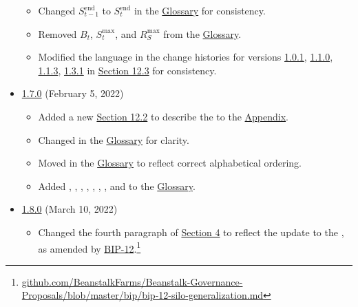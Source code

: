 \documentclass[class=article, crop=false]{standalone}
\begin{document}
\begin{itemize}[topsep=0pt, itemsep=3pt,leftmargin=16pt]
\begin{itemize}
        \item Changed $S_{t-1}^{\text{end}}$ to $S_t^{\text{end}}$ in the \hyperlink{subsection.12.2}{Glossary} for consistency. 
        \item Removed $B_t$, $S_t^{\text{max}}$, and $R_S^{\text{max}}$ from the \hyperlink{subsection.12.2}{Glossary}. 
        \item Modified the language in the change histories for versions \href{https://github.com/BeanstalkFarms/Beanstalk/blob/master/version-history/beanstalk1_0_1.pdf}{1.0.1}, \href{https://github.com/BeanstalkFarms/Beanstalk/blob/master/version-history/beanstalk1_1_0.pdf}{1.1.0}, \href{https://github.com/BeanstalkFarms/Beanstalk/blob/master/version-history/beanstalk1_1_3.pdf}{1.1.3}, \href{https://github.com/BeanstalkFarms/Beanstalk/blob/master/version-history/beanstalk1_3_1.pdf}{1.3.1} in \hyperlink{subsection.12.3}{Section 12.3} for consistency.
    \end{itemize}
    \newpage
    \item \href{https://github.com/BeanstalkFarms/Beanstalk/blob/master/version-history/beanstalk1_7_0.pdf}{1.7.0} (February 5, 2022)
    \begin{itemize}
        \item Added a new \hyperlink{subsection.12.2}{Section 12.2} to describe the  to the \hyperlink{section.12}{Appendix}.
        \item Changed  in the \hyperlink{subsection.12.2}{Glossary} for clarity. 
        \item Moved  in the \hyperlink{subsection.12.2}{Glossary} to reflect correct alphabetical ordering. 
        \item Added , , , , , , , and  to the \hyperlink{subsection.12.2}{Glossary}. 
    \end{itemize}
        \item \href{https://github.com/BeanstalkFarms/Beanstalk/blob/master/version-history/beanstalk1_8_0.pdf}{1.8.0} (March 10, 2022)
    \begin{itemize}
        \item Changed the fourth paragraph of \hyperlink{section.4}{Section 4} to reflect the update to the , as amended by \href{https://github.com/BeanstalkFarms/Beanstalk-Governance-Proposals/blob/master/bip/bip-12-silo-generalization.md}{BIP-12}.\footnote{\href{https://github.com/BeanstalkFarms/Beanstalk-Governance-Proposals/blob/master/bip/bip-12-silo-generalization.md}{github.com/BeanstalkFarms/Beanstalk-Governance-Proposals/blob/master/bip/bip-12-silo-generalization.md}}

\end{itemize}
\end{itemize}
\end{document}
